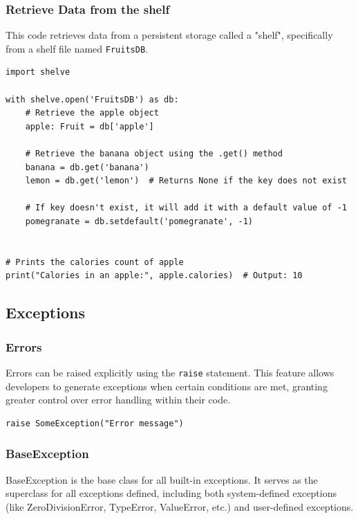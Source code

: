 \subsubsection{Retrieve Data from the shelf}
This code retrieves data from a persistent storage called a "shelf", specifically from a shelf file named \texttt{FruitsDB}.
\begin{codebox}
\begin{verbatim}
import shelve

with shelve.open('FruitsDB') as db:
    # Retrieve the apple object
    apple: Fruit = db['apple']
        
    # Retrieve the banana object using the .get() method
    banana = db.get('banana')
    lemon = db.get('lemon')  # Returns None if the key does not exist
    
    # If key doesn't exist, it will add it with a default value of -1
    pomegranate = db.setdefault('pomegranate', -1)
    
    
# Prints the calories count of apple
print("Calories in an apple:", apple.calories)  # Output: 10
\end{verbatim}
\end{codebox}

\newpage
\subsection{Exceptions}

\subsubsection{Errors}
Errors can be raised explicitly using the \texttt{raise} statement. This feature allows developers to generate exceptions when certain conditions are met, granting greater control over error handling within their code.

\begin{codebox}
\begin{verbatim}
raise SomeException("Error message")
\end{verbatim}
\end{codebox}

\subsubsection{BaseException}
BaseException is the base class for all built-in exceptions. It serves as the superclass for all exceptions defined, including both system-defined exceptions (like ZeroDivisionError, TypeError, ValueError, etc.) and user-defined exceptions.

